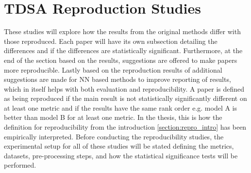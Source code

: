 

\section{TDSA Reproduction Studies}
\label{section:repro_replication}

These studies will explore how the results from the original methods differ with those reproduced. Each paper will have its own subsection detailing the differences and if the differences are statistically significant. Furthermore, at the end of the section based on the results, suggestions are offered to make papers more reproducible. Lastly based on the reproduction results of \citet{tang-etal-2016-effective} additional suggestions are made for NN based methods to improve reporting of results, which in itself helps with both evaluation and reproducibility. A paper is defined as being reproduced if the main result is not statistically significantly different on at least one metric and if the results have the same rank order e.g. model A is better than model B for at least one metric. In the thesis, this is how the definition for reproducibility from the introduction \ref{section:repro_intro} has been empirically interpreted. Before conducting the reproducibility studies, the experimental setup for all of these studies will be stated defining the metrics, datasets, pre-processing steps, and how the statistical significance tests will be performed.


